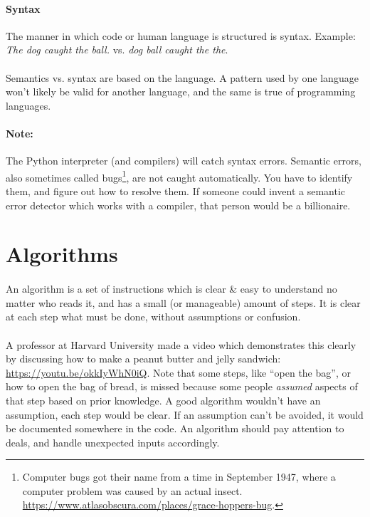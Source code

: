 \documentclass[letter,10pt]{article}
\begin{document}
\paragraph{Syntax} The manner in which code or human language is structured is syntax. Example: \textit{The dog caught the ball.} vs. \textit{dog ball caught the the}.

\paragraph{}Semantics vs. syntax are based on the language. A pattern used by one language won't likely be valid for another language, and the same is true of programming languages.

\paragraph{Note:}The Python interpreter (and compilers) will catch syntax errors. Semantic errors, also sometimes called bugs\footnote{Computer bugs got their name from a time in September 1947, where a computer problem was caused by an actual insect. \url{https://www.atlasobscura.com/places/grace-hoppers-bug}.}, are not caught automatically. You have to identify them, and figure out how to resolve them. If someone could invent a semantic error detector which works with a compiler, that person would be a billionaire.

\section{Algorithms}
\paragraph{}An algorithm is a set of instructions which is clear \& easy to understand no matter who reads it, and has a small (or manageable) amount of steps. It is clear at each step what must be done, without assumptions or confusion.

\paragraph{}A professor at Harvard University made a video which demonstrates this clearly by discussing how to make a peanut butter and jelly sandwich: \url{https://youtu.be/okkIyWhN0iQ}. Note that some steps, like ``open the bag'', or how to open the bag of bread, is missed because some people \textit{assumed} aspects of that step based on prior knowledge. A good algorithm wouldn't have an assumption, each step would be clear. If an assumption can't be avoided, it would be documented somewhere in the code. An algorithm should pay attention to deals, and handle unexpected inputs accordingly.
\end{document}
